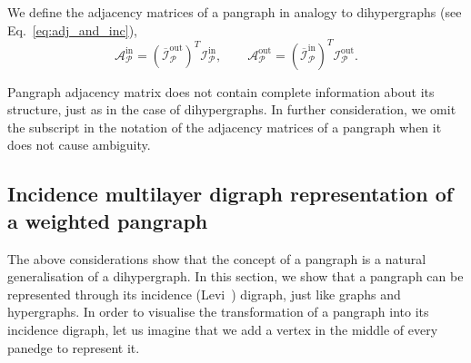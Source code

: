 \documentclass[a4paper,12pt]{article}
\theoremstyle{definition}
\theoremstyle{remark}
\newcommand{\mP}{\mathcal{P}}
\newcommand{\tin}{\mathrm{in}}
\newcommand{\out}{\mathrm{out}}
\newcommand{\inci}{\mathcal{I}^{\tin}}
\newcommand{\inco}{\mathcal{I}^{\out}}
\begin{document}
We define the adjacency matrices of a pangraph in analogy to dihypergraphs (see Eq.~\eqref{eq:adj_and_inc}),
\begin{equation}\label{eq:adj_and_inc3}
\mathcal{A}_{\mP}^{\tin}=(\overline{\mathcal{I}}^{\textrm{out}}_{\mP})^T \inci_{\mP} ,\qquad \mathcal{A}_{\mP}^{\out}=(\overline{\mathcal{I}}^{\textrm{in}}_{\mP})^T \inco_{\mP}.
\end{equation}

Pangraph adjacency matrix does not contain complete information about its structure, just as in the case of dihypergraphs. In further consideration, we omit the subscript in the notation of the adjacency matrices of a pangraph when it does not cause ambiguity.

\subsection{Incidence multilayer digraph representation of a weighted pangraph}\label{sec:Levi_pangraph}

 The above considerations show that the concept of a pangraph is a natural generalisation of a dihypergraph. In this section, we show that a pangraph can be represented through its incidence (Levi~\protect\cite{Levi}) digraph, just like graphs and hypergraphs. In order to visualise the transformation of a pangraph into its incidence digraph, let us imagine that we add a vertex in the middle of every panedge to represent it.
  
\end{document}
